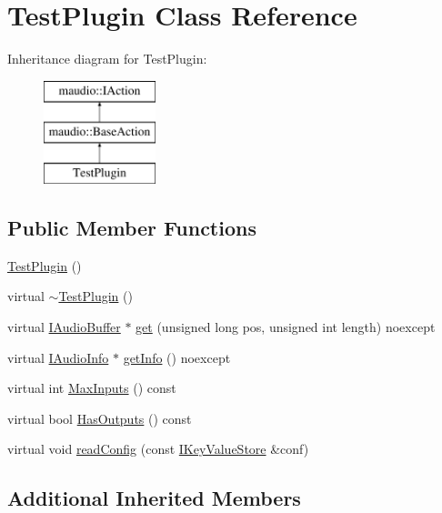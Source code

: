 \hypertarget{classTestPlugin}{\section{Test\-Plugin Class Reference}
\label{classTestPlugin}
}
Inheritance diagram for Test\-Plugin\-:\begin{figure}[H]
\begin{center}
\leavevmode
\includegraphics[height=3.000000cm]{classTestPlugin}
\end{center}
\end{figure}
\subsection*{Public Member Functions}
\begin{DoxyCompactItemize}
\item 
\hyperlink{classTestPlugin_a7ba0585e22aa70b5c47cb5811af287a3}{Test\-Plugin} ()
\item 
virtual \hyperlink{classTestPlugin_a6791e3e7343d31cbedd6f46accbf44b3}{$\sim$\-Test\-Plugin} ()
\item 
virtual \hyperlink{classmaudio_1_1IAudioBuffer}{I\-Audio\-Buffer} $\ast$ \hyperlink{classTestPlugin_af45a5a7d4f61db9503d96ecc1c590251}{get} (unsigned long pos, unsigned int length) noexcept
\item 
virtual \hyperlink{classmaudio_1_1IAudioInfo}{I\-Audio\-Info} $\ast$ \hyperlink{classTestPlugin_a07aa6acf3be682c3552c88282a97ceaa}{get\-Info} () noexcept
\item 
virtual int \hyperlink{classTestPlugin_ad4faa8dad53c62e372e5837d8aa59ecb}{Max\-Inputs} () const 
\item 
virtual bool \hyperlink{classTestPlugin_a2eb2cacb18c097fe26cc1a7640eebac3}{Has\-Outputs} () const 
\item 
virtual void \hyperlink{classTestPlugin_acd8d80abecd3967547e401cba0e1b660}{read\-Config} (const \hyperlink{classmaudio_1_1IKeyValueStore}{I\-Key\-Value\-Store} \&conf)
\end{DoxyCompactItemize}
\subsection*{Additional Inherited Members}


